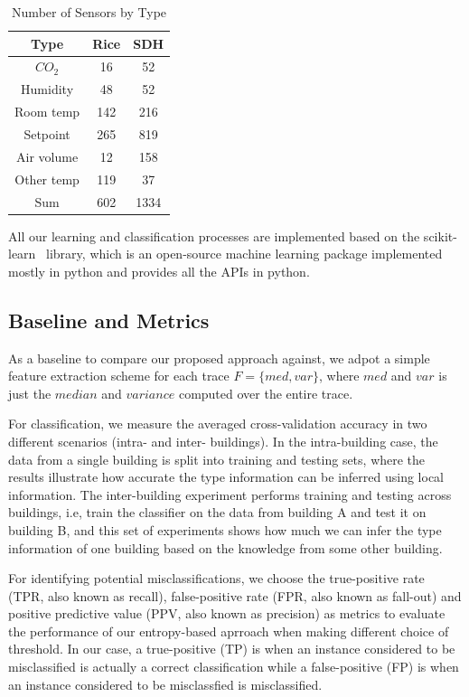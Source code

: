 \begin{table}[ht!]
\caption{Number of Sensors by Type}
\centering %
\begin{tabular}{c c c}%
\hline %
Type & Rice & SDH \\ %
\hline\hline %
$CO_{2}$ & 16 & 52 \\ %
Humidity & 48 & 52 \\
Room temp & 142 & 216 \\
Setpoint & 265 & 819 \\
Air volume & 12 & 158 \\ 
Other temp & 119 & 37 \\ \hline
Sum & 602 & 1334 \\ \hline
\end{tabular}
\label{table:spec} %
\end{table}

All our learning and classification processes are implemented based on the scikit-learn~\cite{scikit} library, which is an open-source machine learning package implemented mostly in python and provides all the APIs in python.

\subsection{Baseline and Metrics}
As a baseline to compare our proposed approach against, we adpot a simple feature extraction scheme for each trace $F=\{med, var\}$, where $med$ and $var$ is just the $median$ and $variance$ computed over the entire trace.

For classification, we measure the averaged cross-validation accuracy in two different scenarios (intra- and inter- buildings). In the intra-building case, the 
data from a single building is split into training and testing sets, where the results illustrate how accurate the type information can be inferred using local 
information. The inter-building experiment performs training and testing across buildings, i.e, train the classifier on the data from building A and test it 
on building B, and this set of experiments shows how much we can infer the type information of one building based on the knowledge from some other building.

For identifying potential misclassifications, we choose the true-positive rate (TPR, also known as recall), false-positive rate (FPR, also known as fall-out) and positive predictive 
value (PPV, also known as precision) as metrics to evaluate the performance of our entropy-based aprroach when making different choice of threshold. In our 
case, a true-positive (TP) is when an instance considered to be misclassified is actually a correct classification while a false-positive (FP) is when an instance 
considered to be misclassfied is misclassified.

